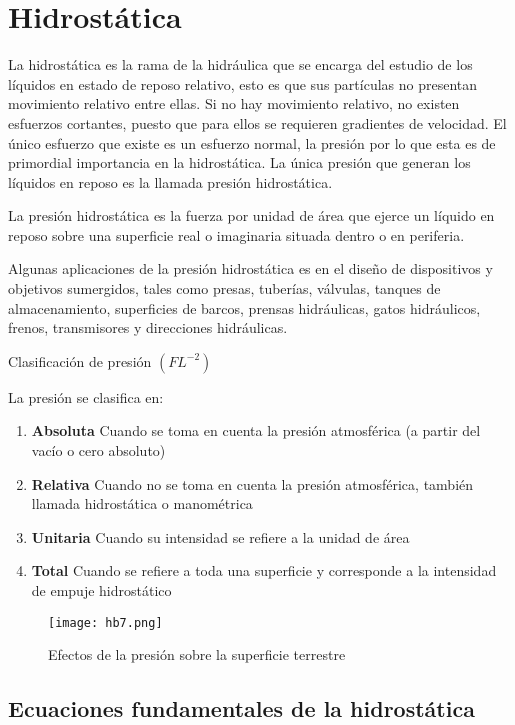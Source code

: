 \section{Hidrostática}

La hidrostática es la rama de la hidráulica que se encarga del estudio de los líquidos en estado de reposo relativo, esto es que sus partículas no presentan movimiento relativo entre ellas. Si no hay movimiento relativo, no existen esfuerzos cortantes, puesto que para ellos se requieren gradientes de velocidad. El único esfuerzo que existe es un esfuerzo normal, la presión
por lo que esta es de primordial importancia en la hidrostática. La única presión que generan los líquidos en reposo es la llamada presión hidrostática.

La presión hidrostática es la fuerza por unidad de área que ejerce un líquido en reposo sobre una superficie real o imaginaria situada dentro o en periferia.

Algunas aplicaciones de la presión hidrostática es en el diseño de dispositivos y objetivos sumergidos, tales como presas, tuberías, válvulas, tanques de almacenamiento, superficies de barcos, prensas hidráulicas, gatos hidráulicos, frenos, transmisores y direcciones hidráulicas.

Clasificación de presión $(FL^{-2})$

La presión se clasifica en: 

\begin{enumerate}
    \item \textbf{Absoluta} Cuando se toma en cuenta la presión atmosférica (a partir del vacío o cero absoluto)
    \item \textbf{Relativa} Cuando no se toma en cuenta la presión atmosférica, también llamada hidrostática o manométrica
    \item \textbf{Unitaria} Cuando su intensidad se refiere a la unidad de área
    \item \textbf{Total} Cuando se refiere a toda una superficie y corresponde a la intensidad de empuje hidrostático
\end{enumerate}

\begin{figure}[h!]
  \centerline{\texttt{[image: hb7.png]}}
  \caption{Efectos de la presión sobre la superficie terrestre}
  \label{hb7}
\end{figure}

\subsection{Ecuaciones fundamentales de la hidrostática}

